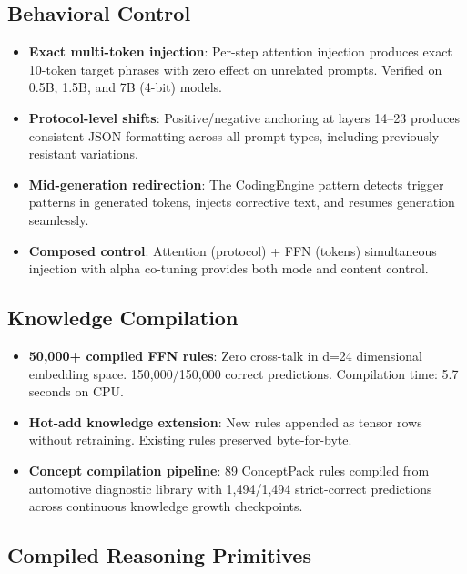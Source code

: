 \documentclass[11pt,a4paper]{article}
\begin{document}
\subsection{Behavioral Control}

\begin{itemize}[leftmargin=*]
\item \textbf{Exact multi-token injection}: Per-step attention injection produces exact 10-token target phrases with zero effect on unrelated prompts. Verified on 0.5B, 1.5B, and 7B (4-bit) models.
\item \textbf{Protocol-level shifts}: Positive/negative anchoring at layers 14--23 produces consistent JSON formatting across all prompt types, including previously resistant variations.
\item \textbf{Mid-generation redirection}: The CodingEngine pattern detects trigger patterns in generated tokens, injects corrective text, and resumes generation seamlessly.
\item \textbf{Composed control}: Attention (protocol) + FFN (tokens) simultaneous injection with alpha co-tuning provides both mode and content control.
\end{itemize}

\subsection{Knowledge Compilation}

\begin{itemize}[leftmargin=*]
\item \textbf{50,000+ compiled FFN rules}: Zero cross-talk in d=24 dimensional embedding space. 150,000/150,000 correct predictions. Compilation time: 5.7 seconds on CPU.
\item \textbf{Hot-add knowledge extension}: New rules appended as tensor rows without retraining. Existing rules preserved byte-for-byte.
\item \textbf{Concept compilation pipeline}: 89 ConceptPack rules compiled from automotive diagnostic library with 1,494/1,494 strict-correct predictions across continuous knowledge growth checkpoints.
\end{itemize}

\subsection{Compiled Reasoning Primitives}
\end{document}
